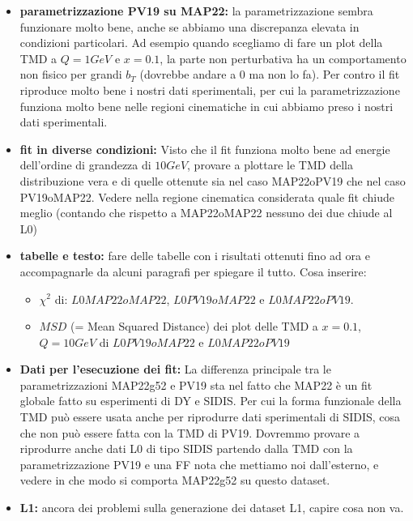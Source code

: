 \documentclass{article}
\begin{document}
\begin{itemize}
    \item \textbf{parametrizzazione PV19 su MAP22: } la parametrizzazione sembra funzionare molto bene, anche se abbiamo una discrepanza elevata in condizioni particolari. Ad esempio quando scegliamo di fare un plot della TMD a $Q = 1 GeV$ e $x = 0.1$, la parte non perturbativa ha un comportamento non fisico per grandi $b_T$ (dovrebbe andare a 0 ma non lo fa). Per contro il fit riproduce molto bene i nostri dati sperimentali, per cui la parametrizzazione funziona molto bene nelle regioni cinematiche in cui abbiamo preso i nostri dati sperimentali. 

    \item \textbf{fit in diverse condizioni: } Visto che il fit funziona molto bene ad energie dell'ordine di grandezza di $10 GeV$, provare a plottare le TMD della distribuzione vera e di quelle ottenute sia nel caso MAP22oPV19 che nel caso PV19oMAP22. Vedere nella regione cinematica considerata quale fit chiude meglio (contando che rispetto a MAP22oMAP22 nessuno dei due chiude al L0) 
    \item  \textbf{tabelle e testo: } fare delle tabelle con i risultati ottenuti fino ad ora e accompagnarle da alcuni paragrafi per spiegare il tutto. Cosa inserire:
    
    \begin{itemize}
        \item $\chi^2$ di: $L0MAP22oMAP22$, $L0PV19oMAP22$ e $L0MAP22oPV19$.
        \item $MSD$ (= Mean Squared Distance) dei plot delle TMD a $x = 0.1$, $Q = 10 GeV$ di $L0PV19oMAP22$  e $L0MAP22oPV19$
    \end{itemize}

    \item \textbf{Dati per l'esecuzione dei fit: } La differenza principale tra le parametrizzazioni MAP22g52 e PV19 sta nel fatto che MAP22 è un fit globale fatto su esperimenti di DY e SIDIS. Per cui la forma funzionale della TMD può essere usata anche per riprodurre dati sperimentali di SIDIS, cosa che non può essere fatta con la TMD di PV19. 
    Dovremmo provare a riprodurre anche dati L0 di tipo SIDIS partendo dalla TMD con la parametrizzazione PV19 e una FF nota che mettiamo noi dall'esterno, e vedere in che modo si comporta MAP22g52 su questo dataset.
    
    \item \textbf{L1: } ancora dei problemi sulla generazione dei dataset L1, capire cosa non va.
\end{itemize}
\end{document}
